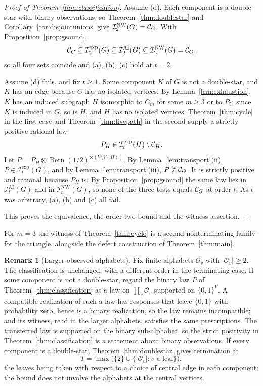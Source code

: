 \documentclass[11pt]{article}
\theoremstyle{plain}
\theoremstyle{definition}
\newtheorem{remark}[theorem]{Remark}
\DeclareMathOperator{\Bern}{Bern}
\newcommand{\INW}{\mathcal I^{\mathrm{NW}}}
\newcommand{\IAI}{\mathcal I^{\mathrm{AI}}}
\newcommand{\Iexp}{\mathcal I^{\mathrm{exp}}}
\begin{document}
\begin{proof}[Proof of Theorem~\ref{thm:classification}]
Assume (d). Each component is a double-star with binary observations, so Theorem~\ref{thm:doublestar} and Corollary~\ref{cor:disjointunions} give $\INW_2(G)=\Cscen{G}$. With Proposition~\ref{prop:gsound},
\[
\Cscen{G}\subseteq\Iexp_2(G)\subseteq\IAI_2(G)\subseteq\INW_2(G)=\Cscen{G},
\]
so all four sets coincide and (a), (b), (c) hold at $t=2$.

Assume (d) fails, and fix $t\ge1$. Some component $K$ of $G$ is not a double-star, and $K$ has an edge because $G$ has no isolated vertices. By Lemma~\ref{lem:exhaustion}, $K$ has an induced subgraph $H$ isomorphic to $C_m$ for some $m\ge3$ or to $P_5$; since $K$ is induced in $G$, so is $H$, and $H$ has no isolated vertices. Theorem~\ref{thm:cycle} in the first case and Theorem~\ref{thm:fivepath} in the second supply a strictly positive rational law
\[
P_H\in\Iexp_t(H)\setminus\Cscen{H}.
\]
Let $P=P_H\otimes\Bern(1/2)^{\otimes(V\setminus V(H))}$. By Lemma~\ref{lem:transport}(ii), $P\in\Iexp_t(G)$, and by Lemma~\ref{lem:transport}(iii), $P\notin\mathcal C_{G}$. It is strictly positive and rational because $P_H$ is. By Proposition~\ref{prop:gsound} the same law lies in $\IAI_t(G)$ and in $\INW_t(G)$, so none of the three tests equals $\mathcal C_{G}$ at order $t$. As $t$ was arbitrary, (a), (b) and (c) all fail.

This proves the equivalence, the order-two bound and the witness assertion.
\end{proof}

For $m=3$ the witness of Theorem~\ref{thm:cycle} is a second nonterminating family for the triangle, alongside the defect construction of Theorem~\ref{thm:main}.

\begin{remark}[Larger observed alphabets]\label{rem:alphabets}
Fix finite alphabets $\mathcal O_v$ with $|\mathcal O_v|\ge2$. The classification is unchanged, with a different order in the terminating case. If some component is not a double-star, regard the binary law $P$ of Theorem~\ref{thm:classification} as a law on $\prod_v\mathcal O_v$ supported on $\{0,1\}^V$. A compatible realization of such a law has responses that leave $\{0,1\}$ with probability zero, hence is a binary realization, so the law remains incompatible; and its witness, read in the larger alphabets, satisfies the same prescriptions. The transferred law is supported on the binary sub-alphabet, so the strict positivity in Theorem~\ref{thm:classification} is a statement about binary observations. If every component is a double-star, Theorem~\ref{thm:doublestar} gives termination at
\[
T=\max\bigl(\{2\}\cup\{|\mathcal O_v|:v\text{ a leaf}\}\bigr),
\]
the leaves being taken with respect to a choice of central edge in each component; the bound does not involve the alphabets at the central vertices.
\end{remark}
\end{document}
